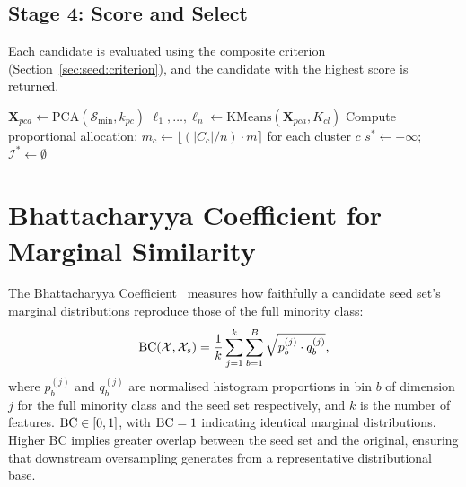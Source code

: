 \subsection{Stage 4: Score and Select}

Each candidate is evaluated using the composite criterion (Section~\ref{sec:seed:criterion}), and the candidate with the highest score is returned.

\begin{algorithm}[ht]
\caption{Geometry-Preserving Seed Selection}
\label{alg:seed_selection}

$\mathbf{X}_{pca} \leftarrow \text{PCA}(\mathcal{S}_{\min}, k_{pc})$\;
$\ell_1, \ldots, \ell_n \leftarrow \text{KMeans}(\mathbf{X}_{pca}, K_{cl})$\;
Compute proportional allocation: $m_c \leftarrow \lfloor (|C_c| / n) \cdot m \rceil$ for each cluster $c$\;
$s^* \leftarrow -\infty$; \quad $\mathcal{I}^* \leftarrow \emptyset$\;
\end{algorithm}

\section{Bhattacharyya Coefficient for Marginal Similarity}
\label{sec:seed:bc}

The Bhattacharyya Coefficient~\cite{bhattacharyya1943measure} measures how faithfully a candidate seed set's marginal distributions reproduce those of the full minority class:
\begin{equation}
  \operatorname{BC}(\mathcal{X}, \mathcal{X}_s) = \frac{1}{k}\sum_{j=1}^{k} \sum_{b=1}^{B} \sqrt{p_b^{(j)} \cdot q_b^{(j)}},
  \label{eq:bc_seed}
\end{equation}
where $p_b^{(j)}$ and $q_b^{(j)}$ are normalised histogram proportions in bin $b$ of dimension $j$ for the full minority class and the seed set respectively, and $k$ is the number of features.
$\operatorname{BC} \in [0,1]$, with $\operatorname{BC} = 1$ indicating identical marginal distributions.
Higher BC implies greater overlap between the seed set and the original, ensuring that downstream oversampling generates from a representative distributional base.

